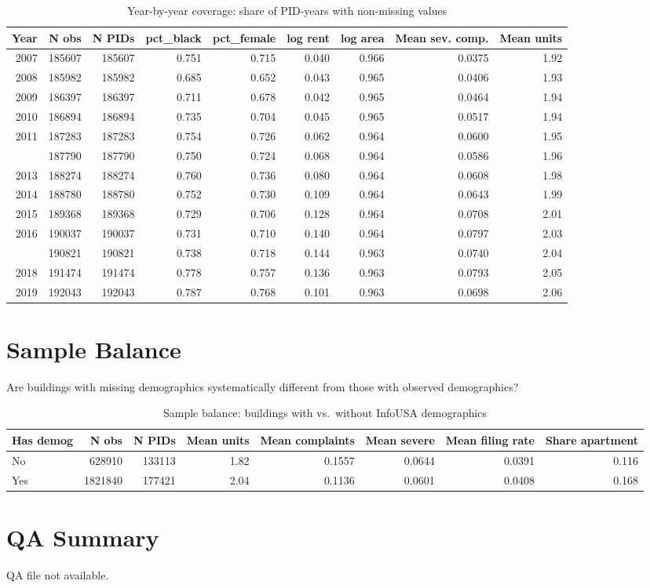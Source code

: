 \documentclass[
  10pt,
]{article}
\begin{document}
\begin{longtable}[t]{rrrrrrrrr}
\caption{\label{tab:coverage-table}Year-by-year coverage: share of PID-years with non-missing values}\\
\toprule
Year & N obs & N PIDs & pct\_black & pct\_female & log rent & log area & Mean sev. comp. & Mean units\\
\midrule
2007 & 185607 & 185607 & 0.751 & 0.715 & 0.040 & 0.966 & 0.0375 & 1.92\\
2008 & 185982 & 185982 & 0.685 & 0.652 & 0.043 & 0.965 & 0.0406 & 1.93\\
2009 & 186397 & 186397 & 0.711 & 0.678 & 0.042 & 0.965 & 0.0464 & 1.94\\
2010 & 186894 & 186894 & 0.735 & 0.704 & 0.045 & 0.965 & 0.0517 & 1.94\\
2011 & 187283 & 187283 & 0.754 & 0.726 & 0.062 & 0.964 & 0.0600 & 1.95\\
\addlinespace
2012 & 187790 & 187790 & 0.750 & 0.724 & 0.068 & 0.964 & 0.0586 & 1.96\\
2013 & 188274 & 188274 & 0.760 & 0.736 & 0.080 & 0.964 & 0.0608 & 1.98\\
2014 & 188780 & 188780 & 0.752 & 0.730 & 0.109 & 0.964 & 0.0643 & 1.99\\
2015 & 189368 & 189368 & 0.729 & 0.706 & 0.128 & 0.964 & 0.0708 & 2.01\\
2016 & 190037 & 190037 & 0.731 & 0.710 & 0.140 & 0.964 & 0.0797 & 2.03\\
\addlinespace
2017 & 190821 & 190821 & 0.738 & 0.718 & 0.144 & 0.963 & 0.0740 & 2.04\\
2018 & 191474 & 191474 & 0.778 & 0.757 & 0.136 & 0.963 & 0.0793 & 2.05\\
2019 & 192043 & 192043 & 0.787 & 0.768 & 0.101 & 0.963 & 0.0698 & 2.06\\
\bottomrule
\end{longtable}
\endgroup{}

\section{Sample Balance}\label{sample-balance}

Are buildings with missing demographics systematically different from
those with observed demographics?

\begin{longtable}[t]{lrrrrrrr}
\caption{\label{tab:balance-table}Sample balance: buildings with vs.~without InfoUSA demographics}\\
\toprule
Has demog & N obs & N PIDs & Mean units & Mean complaints & Mean severe & Mean filing rate & Share apartment\\
\midrule
No & 628910 & 133113 & 1.82 & 0.1557 & 0.0644 & 0.0391 & 0.116\\
Yes & 1821840 & 177421 & 2.04 & 0.1136 & 0.0601 & 0.0408 & 0.168\\
\bottomrule
\end{longtable}

\section{QA Summary}\label{qa-summary}

QA file not available.
\end{document}
